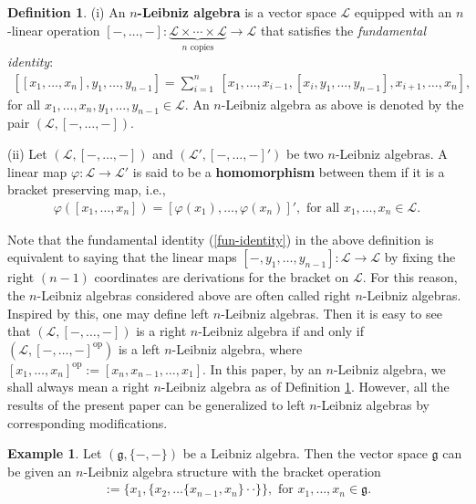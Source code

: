 \documentclass[a4paper,reqno,10pt]{amsart}
\theoremstyle{plain}
\theoremstyle{definition}
\newtheorem{defn}[thm]{Definition}
\newtheorem{exam}[thm]{Example}
\theoremstyle{remark}
\begin{document}
\begin{defn}\label{defn-n-leib}
    (i) An {\bf $n$-Leibniz algebra} is a vector space $\mathcal{L}$ equipped with an $n$-linear operation $[-, \ldots, -] : \underbrace{\mathcal{L} \times \cdots \times \mathcal{L} }_{n \text{ copies}} \rightarrow \mathcal{L}$ that satisfies the {\em fundamental identity}:
    \begin{align}\label{fun-identity}
        [[ x_1, \ldots, x_n],  y_1, \ldots, y_{n-1}] = \sum_{i=1}^n ~ [x_1, \ldots, x_{i-1}, [x_i, y_1, \ldots, y_{n-1}], x_{i+1}, \ldots, x_n],
    \end{align}
    for all $x_1, \ldots, x_n, y_1, \ldots, y_{n-1} \in \mathcal{L}$. An $n$-Leibniz algebra as above is denoted by the pair $(\mathcal{L}, [-, \ldots, -])$.

    \medskip

    (ii) Let $(\mathcal{L}, [-, \ldots, -])$ and $(\mathcal{L}', [-, \ldots, -]')$ be two $n$-Leibniz algebras. A linear map $\varphi: \mathcal{L} \rightarrow \mathcal{L}'$ is said to be a {\bf homomorphism} between them if it is a bracket preserving map, i.e.,
    \begin{align*}
        \varphi ([x_1, \ldots, x_n]) = [\varphi (x_1), \ldots, \varphi (x_n )]', \text{ for all } x_1, \ldots, x_n \in \mathcal{L}. 
    \end{align*}
    \end{defn}

Note that the fundamental identity (\ref{fun-identity}) in the above definition is equivalent to saying that the linear maps $[-, y_1, \ldots, y_{n-1}]: \mathcal{L} \rightarrow \mathcal{L}$ by fixing the right $(n-1)$ coordinates are derivations for the bracket on $\mathcal{L}$. For this reason, the $n$-Leibniz algebras considered above are often called right $n$-Leibniz algebras. Inspired by this, one may define left $n$-Leibniz algebras. Then it is easy to see that $(\mathcal{L}, [-, \ldots, -])$ is a right $n$-Leibniz algebra if and only if $(\mathcal{L}, [-, \ldots, -]^\mathrm{op})$ is a left $n$-Leibniz algebra, where $[x_1, \ldots, x_n]^\mathrm{op} := [x_n, x_{n-1}, \ldots, x_1]$. In this paper, by an $n$-Leibniz algebra, we shall always mean a right $n$-Leibniz algebra as of Definition \ref{defn-n-leib}. However, all the results of the present paper can be generalized to left $n$-Leibniz algebras by corresponding modifications.

\begin{exam}\label{leib-to-n} \cite[Proposition 3.2]{casas1} Let $(\mathfrak{g}, \{ -, -\})$ be a Leibniz algebra. Then the vector space $\mathfrak{g}$ can be given an $n$-Leibniz algebra structure with the bracket operation
    \begin{align*}
        [x_1, \ldots, x_n] := \{ x_1, \{ x_2, \ldots \{ x_{n-1}, x_n \} \cdot \cdot \} \}, \text{ for } x_1, \ldots, x_n \in \mathfrak{g}.
    \end{align*}
\end{exam}
\end{document}
